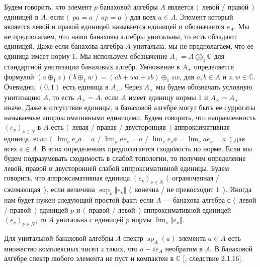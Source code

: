 Будем говорить, что элемент $p$ банаховой алгебры $A$ является $\langle$~левой /
правой~$\rangle$  единицей в $A$, если $\langle$~$pa=a$ / $ap=a$~$\rangle$ для
всех $a\in A$. Элемент который является левой и правой единицей называется
единицей и обозначается $e_A$. Мы не предполагаем, что наши банаховы алгебры
унитальны, то есть обладают единицей. Даже если банахова алгебра $A$ унитальна,
мы не предполагаем, что ее единица имеет норму 1. Мы используем обозначение
$A_+=A\bigoplus_1\mathbb{C}$ для стандартной унитизации банаховых алгебр.
Умножение в $A_+$ определяется формулой $(a\oplus_1 z)(b\oplus_1
w)=(ab+wa+zb)\oplus_1 zw$, для $a,b\in A$ и $z,w\in\mathbb{C}$. Очевидно,
$(0,1)$ есть единица в $A_+$. Через $A_\times$ мы будем обозначать условную
унитизацию $A$, то есть $A_\times=A$, если $A$ имеет единицу нормы $1$ и
$A_\times=A_+$ иначе. Даже в отсутствие единицы, в банаховой алгебре могут быть
ее суррогаты называемые аппроксимативными единицами. Будем говорить, что
направленность ${(e_\nu)}_{\nu\in N}$ в $A$ есть $\langle$~левая / правая /
двусторонняя~$\rangle$ аппроксимативная единица, если 
$\langle$~$\lim_\nu e_\nu a=a$ / 
$\lim_\nu ae_\nu=a$ / $\lim_\nu e_\nu a=\lim_\nu ae_\nu=a$~$\rangle$ для
всех $a\in A$. В этих определениях предполагается сходимость по норме. Если мы
будем подразумевать сходимость в слабой топологии, то получим определение левой,
правой и двусторонней слабой аппроксимативной единицы. Будем говорить, что
аппроксимативная единица ${(e_\nu)}_{\nu\in N}$ $\langle$~ограниченная /
сжимающая~$\rangle$, если величина $\sup_\nu\Vert e_\nu\Vert$ $\langle$~конечна
/ не превосходит $1$~$\rangle$. Иногда нам будет нужен следующий простой факт:
если $A$ --- банахова алгебра с $\langle$~левой / правой~$\rangle$ единицей $p$
и $\langle$~правой / левой~$\rangle$ аппроксимативной единицей
${(e_\nu)}_{\nu\in N}$, то $A$ унитальна с единицей $p$ нормы $\lim_\nu\Vert
e_\nu\Vert$. 

Для унитальной банаховой алгебры $A$ спектр $\operatorname{sp}_A(a)$ элемента
$a\in A$ есть множество комплексных чисел $z$ таких, что $a-ze_A$ необратим в
$A$. В банаховой алгебре спектр любого элемента не пуст и компактен в
$\mathbb{C}$ [\cite{HelBanLocConvAlg}, следствие 2.1.16].

